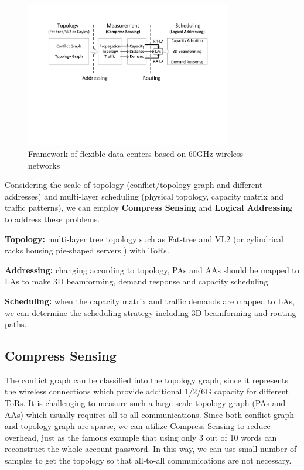 \documentclass[journal,onecolumn,11pt]{IEEEtran}
\begin{document}
\begin{figure}[!htp]
\centering
\includegraphics[width=0.8\textwidth]{framework.pdf}
\caption{Framework of flexible data centers based on 60GHz wireless networks}
\label{framework}
\end{figure}

Considering the scale of topology (conflict/topology graph and different addresses) and multi-layer scheduling (physical topology, capacity matrix and traffic patterns), we can employ \textbf{Compress Sensing} and \textbf{Logical Addressing} to address these problems.

\textbf{Topology:} multi-layer tree topology such as Fat-tree and VL2 (or cylindrical racks housing pie-shaped servers \cite{Shin:2012:FCW:2396556.2396560}) with ToRs.

\textbf{Addressing:} changing according to topology, PAs and AAs should be mapped to LAs to make 3D beamforming, demand response and capacity scheduling.

\textbf{Scheduling:} when the capacity matrix and traffic demands are mapped to LAs, we can determine the scheduling strategy including 3D beamforming and routing paths.


\subsection{Compress Sensing}

The conflict graph can be classified into the topology graph, since it represents the wireless connections which provide additional 1/2/6G capacity for different ToRs. It is challenging to measure such a large scale topology graph (PAs and AAs) which usually requires all-to-all communications. Since both conflict graph \cite{Halperin:2011:ADC:2018436.2018442} and topology graph \cite{Chen:2010:GAA:1851182.1851190} are sparse, we can utilize Compress Sensing to reduce overhead, just as the famous example that using only 3 out of 10 words can reconstruct the whole account password. In this way, we can use small number of samples to get the topology so that all-to-all communications are not necessary.
\end{document}
